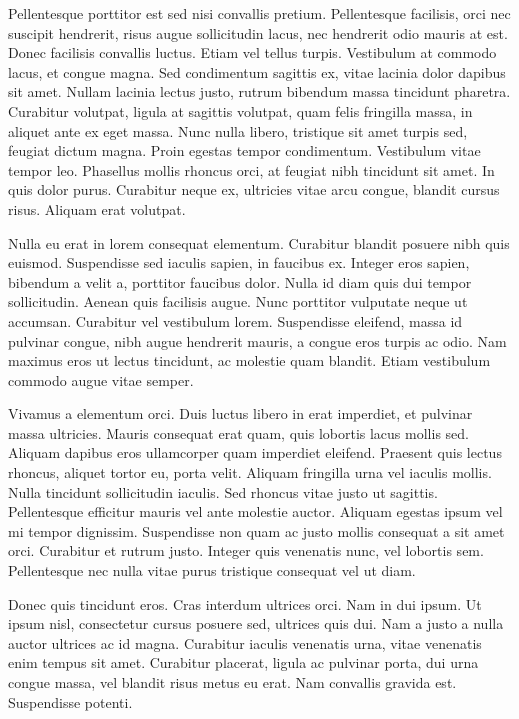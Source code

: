 \documentclass[a4paper, 10pt, conference]{ieeeconf}
\begin{document}
Pellentesque porttitor est sed nisi convallis pretium. Pellentesque facilisis, orci nec suscipit hendrerit, risus augue sollicitudin lacus, nec hendrerit odio mauris at est. Donec facilisis convallis luctus. Etiam vel tellus turpis. Vestibulum at commodo lacus, et congue magna. Sed condimentum sagittis ex, vitae lacinia dolor dapibus sit amet. Nullam lacinia lectus justo, rutrum bibendum massa tincidunt pharetra. Curabitur volutpat, ligula at sagittis volutpat, quam felis fringilla massa, in aliquet ante ex eget massa. Nunc nulla libero, tristique sit amet turpis sed, feugiat dictum magna. Proin egestas tempor condimentum. Vestibulum vitae tempor leo. Phasellus mollis rhoncus orci, at feugiat nibh tincidunt sit amet. In quis dolor purus. Curabitur neque ex, ultricies vitae arcu congue, blandit cursus risus. Aliquam erat volutpat.

Nulla eu erat in lorem consequat elementum. Curabitur blandit posuere nibh quis euismod. Suspendisse sed iaculis sapien, in faucibus ex. Integer eros sapien, bibendum a velit a, porttitor faucibus dolor. Nulla id diam quis dui tempor sollicitudin. Aenean quis facilisis augue. Nunc porttitor vulputate neque ut accumsan. Curabitur vel vestibulum lorem. Suspendisse eleifend, massa id pulvinar congue, nibh augue hendrerit mauris, a congue eros turpis ac odio. Nam maximus eros ut lectus tincidunt, ac molestie quam blandit. Etiam vestibulum commodo augue vitae semper.

Vivamus a elementum orci. Duis luctus libero in erat imperdiet, et pulvinar massa ultricies. Mauris consequat erat quam, quis lobortis lacus mollis sed. Aliquam dapibus eros ullamcorper quam imperdiet eleifend. Praesent quis lectus rhoncus, aliquet tortor eu, porta velit. Aliquam fringilla urna vel iaculis mollis. Nulla tincidunt sollicitudin iaculis. Sed rhoncus vitae justo ut sagittis. Pellentesque efficitur mauris vel ante molestie auctor. Aliquam egestas ipsum vel mi tempor dignissim. Suspendisse non quam ac justo mollis consequat a sit amet orci. Curabitur et rutrum justo. Integer quis venenatis nunc, vel lobortis sem. Pellentesque nec nulla vitae purus tristique consequat vel ut diam.

Donec quis tincidunt eros. Cras interdum ultrices orci. Nam in dui ipsum. Ut ipsum nisl, consectetur cursus posuere sed, ultrices quis dui. Nam a justo a nulla auctor ultrices ac id magna. Curabitur iaculis venenatis urna, vitae venenatis enim tempus sit amet. Curabitur placerat, ligula ac pulvinar porta, dui urna congue massa, vel blandit risus metus eu erat. Nam convallis gravida est. Suspendisse potenti.
\end{document}
